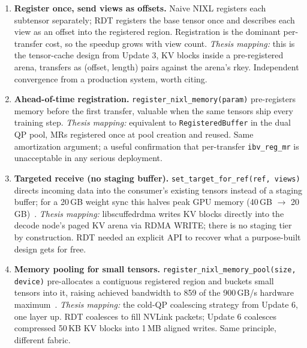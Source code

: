 \documentclass[11pt,letterpaper]{article}
\begin{document}
\begin{enumerate}
\item \textbf{Register once, send views as offsets.} Naive NIXL registers each subtensor separately; RDT registers the base tensor once and describes each view as an offset into the registered region. Registration is the dominant per-transfer cost, so the speedup grows with view count. \emph{Thesis mapping:} this is the tensor-cache design from Update 3, KV blocks inside a pre-registered arena, transfers as (offset, length) pairs against the arena's rkey. Independent convergence from a production system, worth citing.
\item \textbf{Ahead-of-time registration.} \texttt{register\_nixl\_memory(param)} pre-registers memory before the first transfer, valuable when the same tensors ship every training step. \emph{Thesis mapping:} equivalent to \texttt{RegisteredBuffer} in the dual QP pool, MRs registered once at pool creation and reused. Same amortization argument; a useful confirmation that per-transfer \texttt{ibv\_reg\_mr} is unacceptable in any serious deployment.
\item \textbf{Targeted receive (no staging buffer).} \texttt{set\_target\_for\_ref(ref, views)} directs incoming data into the consumer's existing tensors instead of a staging buffer; for a 20\,GB weight sync this halves peak GPU memory (40\,GB $\to$ 20\,GB)~\cite{anyscale_rdt2}. \emph{Thesis mapping:} libscuffedrdma writes KV blocks directly into the decode node's paged KV arena via RDMA WRITE; there is no staging tier by construction. RDT needed an explicit API to recover what a purpose-built design gets for free.
\item \textbf{Memory pooling for small tensors.} \texttt{register\_nixl\_memory\_pool(size, device)} pre-allocates a contiguous registered region and buckets small tensors into it, raising achieved bandwidth to 859 of the 900\,GB/s hardware maximum~\cite{anyscale_rdt2}. \emph{Thesis mapping:} the cold-QP coalescing strategy from Update 6, one layer up. RDT coalesces to fill NVLink packets; Update 6 coalesces compressed 50\,KB KV blocks into 1\,MB aligned writes. Same principle, different fabric.
\end{enumerate}
\end{document}
